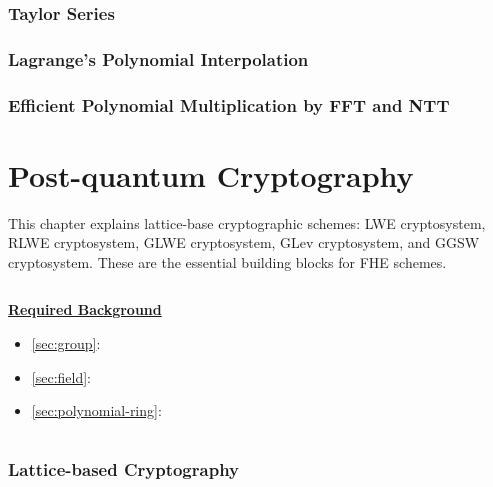 \documentclass[11pt]{article}
\begin{document}
\clearpage

\section{Taylor Series}
\label{sec:taylor-series}


\clearpage

\section{Lagrange's Polynomial Interpolation}
\label{sec:polynomial-interpolation}


\clearpage

\section{Efficient Polynomial Multiplication by FFT and NTT}
\label{sec:ntt}


\clearpage





\part{Post-quantum Cryptography}
\label{part:pqc}

\renewcommand{\thesection}{B-\arabic{section}}
\setcounter{section}{0}

This chapter explains lattice-base cryptographic schemes: LWE cryptosystem, RLWE cryptosystem, GLWE cryptosystem, GLev cryptosystem, and GGSW cryptosystem. These are the essential building blocks for FHE schemes. 


$ $

\noindent \textbf{\underline{Required Background}}

\begin{itemize}
\item \autoref{sec:group}: 
\item \autoref{sec:field}: 
\item \autoref{sec:polynomial-ring}: 
\end{itemize}

$ $

\clearpage

\section{Lattice-based Cryptography}
\label{sec:lattice}

\end{document}
